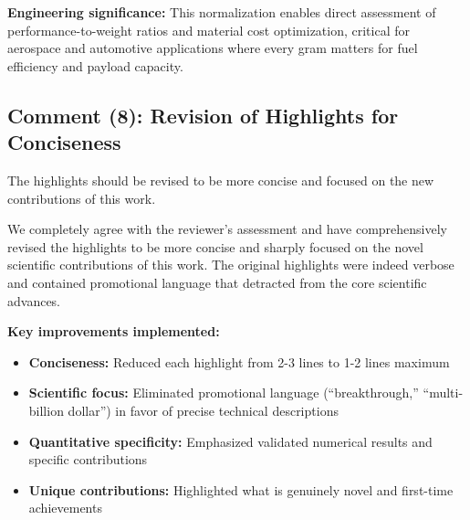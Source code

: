 \documentclass[11pt,a4paper]{article}
\newenvironment{reviewerbox}{%
    \par\medskip\noindent{\color{reviewercolor}\rule{\linewidth}{2pt}}\par
    \noindent{\color{reviewercolor}\bfseries Reviewer Comment}\par\smallskip
}{%
    \par\noindent{\color{reviewercolor}\rule{\linewidth}{0.5pt}}\medskip
}
\newenvironment{responsebox}{%
    \par\medskip\noindent{\color{responsecolor}\rule{\linewidth}{2pt}}\par
    \noindent{\color{responsecolor}\bfseries Response}\par\smallskip
}{%
    \par\noindent{\color{responsecolor}\rule{\linewidth}{0.5pt}}\medskip
}
\begin{document}
\textbf{Engineering significance:} This normalization enables direct assessment of performance-to-weight ratios and material cost optimization, critical for aerospace and automotive applications where every gram matters for fuel efficiency and payload capacity.

\newpage

\subsection*{Comment (8): Revision of Highlights for Conciseness}

\begin{reviewerbox}
The highlights should be revised to be more concise and focused on the new contributions of this work.
\end{reviewerbox}

\begin{responsebox}
We completely agree with the reviewer's assessment and have comprehensively revised the highlights to be more concise and sharply focused on the novel scientific contributions of this work. The original highlights were indeed verbose and contained promotional language that detracted from the core scientific advances.

\textbf{Key improvements implemented:}
\begin{itemize}
    \item \textbf{Conciseness:} Reduced each highlight from 2-3 lines to 1-2 lines maximum
    \item \textbf{Scientific focus:} Eliminated promotional language (``breakthrough,'' ``multi-billion dollar'') in favor of precise technical descriptions
    \item \textbf{Quantitative specificity:} Emphasized validated numerical results and specific contributions
    \item \textbf{Unique contributions:} Highlighted what is genuinely novel and first-time achievements
\end{itemize}
\end{responsebox}
\end{document}
